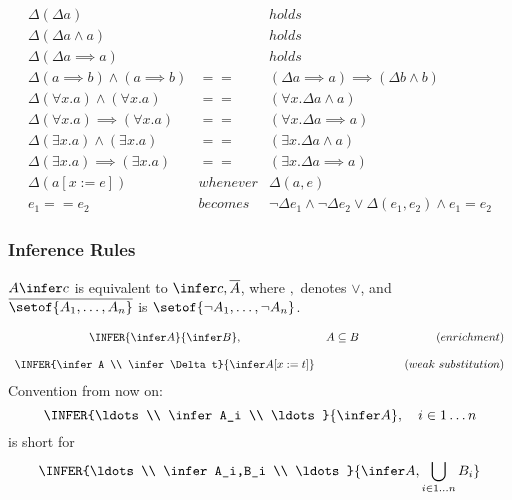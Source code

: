 \begin{eqnarray*}
   \Delta(\Delta a) && holds
\\ \Delta(\Delta a \land a) && holds
\\ \Delta(\Delta a \implies a) && holds
\\ \Delta(a \implies b)\land(a \implies b)
   &==&
   (\Delta a \implies a) \implies (\Delta b \land b)
\\ \Delta(\forall x.a) \land (\forall x.a)
   &==&
   (\forall x.\Delta a \land a)
\\ \Delta(\forall x.a) \implies (\forall x.a)
   &==&
   (\forall x.\Delta a \implies a)
\\ \Delta(\exists x.a) \land (\exists x.a)
   &==&
   (\exists x.\Delta a \land a)
\\ \Delta(\exists x.a) \implies (\exists x.a)
   &==&
   (\exists x.\Delta a \implies a)
\\ \Delta(a[x:=e]) &whenever& \Delta(a,e)
\\ e_1 == e_2
   &becomes&
   \lnot\Delta e_1 \land \lnot\Delta e_2
   \lor
   \Delta(e_1,e_2) \land e_1 = e_2
\end{eqnarray*}

\newpage
\subsubsection{Inference Rules}

$A \infer c$ is equivalent to $\infer c, \overline A$,
where $,$ denotes $\lor$,
and $\overline{\setof{A_1,\ldots,A_n}}$
is $\setof{\lnot A_1, \ldots, \lnot A_n}$.


$$\begin{array}{c@{\quad}l@{\qquad\qquad}r}
  \INFER{\infer A}{\infer B}, & A \subseteq B & (enrichment)
\\
\\\INFER%
    {\infer A \\ \infer \Delta t}%
    {\infer A[x:=t]}
    && (weak~substitution)
\end{array}$$
Convention from now on:
$$
 \INFER{\ldots \\ \infer A_i \\ \ldots}%
       {\infer A}
       , \quad i \in 1\ldots n
$$
is short for
$$
 \INFER{\ldots \\ \infer A_i,B_i \\ \ldots}%
       {\infer A, \bigcup_{i \in 1 \ldots n} B_i}
$$

